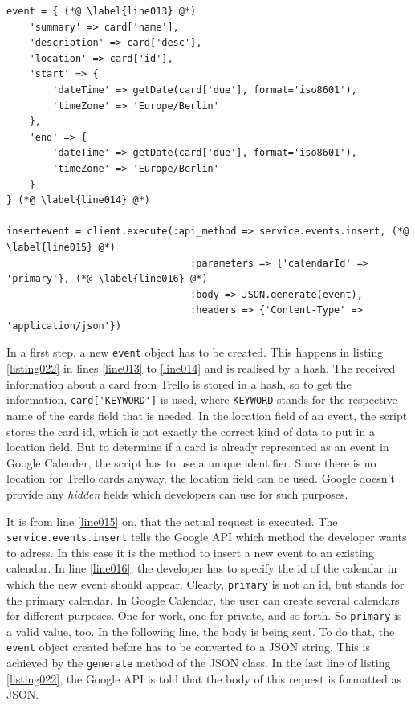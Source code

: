 \begin{lstlisting}[aboveskip=1\baselineskip, caption=Adding a new event to Google Calendar., label=listing022]
event = { (*@ \label{line013} @*)
	'summary' => card['name'],
	'description' => card['desc'],
	'location' => card['id'],
	'start' => {
		'dateTime' => getDate(card['due'], format='iso8601'),
		'timeZone' => 'Europe/Berlin'
	},
	'end' => {
		'dateTime' => getDate(card['due'], format='iso8601'),
		'timeZone' => 'Europe/Berlin'
	}
} (*@ \label{line014} @*)

insertevent = client.execute(:api_method => service.events.insert, (*@ \label{line015} @*)
								:parameters => {'calendarId' => 'primary'}, (*@ \label{line016} @*)
								:body => JSON.generate(event),
								:headers => {'Content-Type' => 'application/json'})
\end{lstlisting}

In a first step, a new \lstinline{event} object has to be created. This happens in listing \ref{listing022} in lines \ref{line013} to \ref{line014} and is realised by a hash. The received information about a card from Trello is stored in a hash, so to get the information, \lstinline{card['KEYWORD']} is used, where \lstinline{KEYWORD} stands for the respective name of the cards field that is needed. In the location field of an event, the script stores the card id, which is not exactly the correct kind of data to put in a location field. But to determine if a card is already represented as an event in Google Calender, the script has to use a unique identifier. Since there is no location for Trello cards anyway, the location field can be used. Google doesn't provide any \emph{hidden} fields which developers can use for such purposes.

It is from line \ref{line015} on, that the actual request is executed. The \lstinline{service.events.insert} tells the Google API which method the developer wants to adress. \cite{google:calapi} In this case it is the method to insert a new event to an existing calendar. In line \ref{line016}, the developer has to specify the id of the calendar in which the new event should appear. Clearly, \texttt{primary} is not an id, but stands for the primary calendar. In Google Calendar, the user can create several calendars for different purposes. One for work, one for private, and so forth. So \texttt{primary} is a valid value, too. In the following line, the body is being sent. To do that, the \lstinline{event} object created before has to be converted to a JSON string. This is achieved by the \lstinline{generate} method of the JSON class. \cite{json:docu} In the last line of listing \ref{listing022}, the Google API is told that the body of this request is formatted as JSON.

